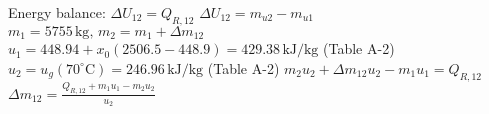 Energy balance: \( \Delta U_{12} = Q_{R,12} \)  
\( \Delta U_{12} = m_{u2} - m_{u1} \)  
\( m_1 = 5755 \, \text{kg}, \, m_2 = m_1 + \Delta m_{12} \)  
\( u_1 = 448.94 + x_0(2506.5 - 448.9) = 429.38 \, \text{kJ/kg} \) (Table A-2)  
\( u_2 = u_g(70^\circ \text{C}) = 246.96 \, \text{kJ/kg} \) (Table A-2)  
\( m_2 u_2 + \Delta m_{12} u_2 - m_1 u_1 = Q_{R,12} \)  
\( \Delta m_{12} = \frac{Q_{R,12} + m_1 u_1 - m_2 u_2}{u_2} \)